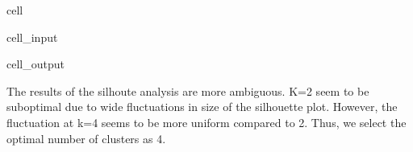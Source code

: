\documentclass[letterpaper,10pt,english]{jupyterBook}
\begin{document}
\begin{sphinxuseclass}{cell}\begin{sphinxVerbatimInput}

\begin{sphinxuseclass}{cell_input}
\begin{sphinxVerbatim}[commandchars=\\\{\}]
   
    
       
       
    \PYG{p}{[}\PYG{p}{]}
\end{sphinxVerbatim}

\end{sphinxuseclass}\end{sphinxVerbatimInput}
\begin{sphinxVerbatimOutput}

\begin{sphinxuseclass}{cell_output}
\noindent{}

\noindent{}

\noindent{}

\end{sphinxuseclass}\end{sphinxVerbatimOutput}

\end{sphinxuseclass}
\sphinxAtStartPar
The results of the silhoute analysis are more ambiguous.  K=2 seem to be sub\sphinxhyphen{}optimal due to wide fluctuations in size of the silhouette plot.  However, the fluctuation at k=4 seems to be more uniform compared to 2. Thus, we select the optimal number of clusters as 4.
\end{document}
